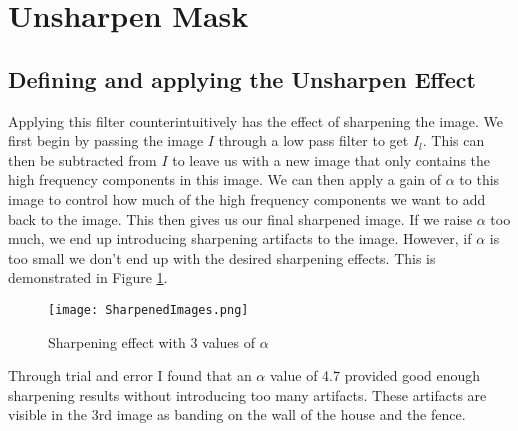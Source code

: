 \section{Unsharpen Mask}
\subsection{Defining and applying the Unsharpen Effect}
Applying this filter counterintuitively has the effect of sharpening the image. We first begin by passing the image $I$ through a low pass filter to get $I_l$. This can then be subtracted from $I$ to leave us with a new image that only contains the high frequency components in this image. We can then apply a gain of $\alpha$ to this image to control how much of the high frequency components we want to add back to the image. This then gives us our final sharpened image. If we raise $\alpha$ too much, we end up introducing sharpening artifacts to the image. However, if $\alpha$ is too small we don't end up with the desired sharpening effects. This is demonstrated in Figure \ref{fig:SharpenedImages}.

\begin{figure}[!h]
    \texttt{[image: SharpenedImages.png]}
    \centering
    \caption{Sharpening effect with 3 values of $\alpha$}
    \label{fig:SharpenedImages}
\end{figure}

\noindent Through trial and error I found that an $\alpha$ value of 4.7 provided good enough sharpening results without introducing too many artifacts. These artifacts are visible in the 3rd image as banding on the wall of the house and the fence.